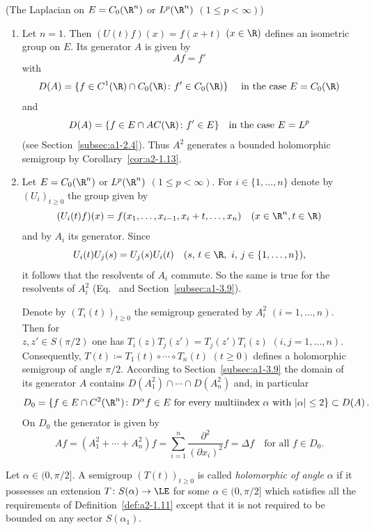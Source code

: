 \begin{example*}\label{ex:a2-1.13-kgk}(The Laplacian on $E = C_{0}(\R^{n})$ or $L^{p}(\R^{n})$ $(1 \leq p < \infty)$) 
\begin{enumerate}[\upshape (i), wide, labelindent=.25em]
\item \label{ex:a2-1.13-kgk-1}
Let $n = 1$.
Then $(U(t)f)(x) = f(x+t)$ $(x \in \R)$ defines an isometric group on $E$.
Its generator $A$ is given by 
\[
Af = f'
\]  
with
\[
D(A) = \{f \in C^{1}(\R) \cap C_{0}(\R) \colon f' \in C_{0}(\R)\}
\quad \text{ in the case } E = C_{0}(\R)
\]
and
\[
D(A) = \{f \in E \cap AC(\R) \colon f' \in E\} \quad \text{in the case } E = L^{p}
\] 
(see Section~\ref{subsec:a1-2.4}).
Thus $A^{2}$ generates a bounded holomorphic semigroup by Corollary~\ref{cor:a2-1.13}. 
\item \label{ex:a2-1.13-kgk-2}
Let $E = C_{0}(\R^{n})$ or $L^{p}(\R^{n})$ $(1 \leq p < \infty)$.
For $i \in \{1,\ldots,n\}$ denote by $(U_{i})_{t \geq 0}$ the group given by 
\[
(U_{i}(t)f)(x) = f(x_{1},\ldots,x_{i-1},x_{i}+t,\ldots,x_{n}) \quad  (x \in \R^{n}, t \in \R)
\]
and by $A_{i}$ its generator.
Since 
\[ U_{i}(t)U_{j}(s) = U_{j}(s)U_{i}(t) \quad (s,\,t \in \R,\ i,\,j \in \{1, \ldots, n \}), 
\]
it follows that the resolvents of\/ $A_{i}$ commute.
So the same is true for the resolvents of\/ $A_{i}^{2}$ (\cf Eq.~ and 
Section~\ref{subsec:a1-3.9}). 

Denote by $(T_{i}(t))_{t \geq 0}$ 
the semigroup generated by $A_{i}^{2}$ $(i=1,\ldots,n)$.
Then for \\
$z,z' \in S(\pi/2)$ one has $T_{i}(z)T_{j}(z') = T_{j}(z')T_{i}(z)$ $(i,j=1,\ldots,n)$.
Consequently, $T(t) \coloneqq T_{1}(t) \circ \cdots \circ T_{n}(t)$ $(t \geq 0)$ defines a holomorphic semigroup of angle $\pi/2$.
According to  
Section~\ref{subsec:a1-3.9} the domain of its generator $A$ contains $D(A_{1}^{2}) \cap \cdots \cap D(A_{n}^{2})$ and, in particular
\[
D_{0} = \{f \in E \cap C^{2}(\R^{n}) \colon D^{\alpha}f \in E \text{ for every multiindex } \alpha \text{ with } |\alpha| \leq 2\} \subset D(A)\,.
\]
On $D_{0}$ the generator is given by
\[
    Af = (A_{1}^{2} + \cdots + A_{n}^{2})f =
    \sum_{i = 1}^{n} \frac{\partial^{2}}{(\partial x_{i})^{2}} f
    = \Delta f \quad \text{for all $f \in D_{0}$.} 
\]
\end{enumerate}
\end{example*}
Let $\alpha \in (0,\pi/2]$.
A semigroup $(T(t))_{t \geq 0}$ is called \emph{holomorphic of angle} $\alpha$ if it possesses an extension $T \colon S(\alpha) \to \LE$ for some $\alpha \in (0,\pi/2]$ which satisfies all the requirements of Definition~\ref{def:a2-1.11} except that it is not required to be bounded on any sector $S(\alpha_{1})$.
